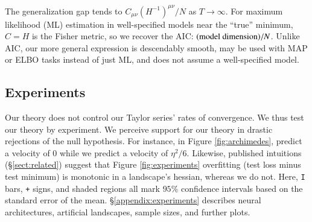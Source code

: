             The generalization gap tends  
            to $C_{\mu\nu}(H^{-1})^{\mu\nu}/N$ as $T\to\infty$.  For maximum
            likelihood (ML) estimation in well-specified models near the ``true''
            minimum, $C=H$ is the Fisher metric, so we recover the AIC:
            $(\textnormal{model dimension})/N$.  Unlike AIC, our more general
            expression is descendably smooth, may be used with MAP or ELBO tasks
            instead of just ML, and does not assume a well-specified model.

            \newpage
    \subsection{Experiments}
        Our theory does not control our Taylor series' rates of convergence. 
        We thus test our theory by experiment.  We perceive support for our
        theory in drastic rejections of the null hypothesis.  For instance, in
        Figure \ref{fig:archimedes}, \cite{ch18} predict a velocity of
        $0$ while we predict a velocity of $\eta^2/6$.  Likewise, published
        intuitions (\S\ref{sect:related}) suggest that Figure
        \ref{fig:experiments} overfitting (test loss minus test
        minimum) is monotonic in a landscape's hessian, whereas we do not.
        Here, \texttt{I} bars, \texttt{+} signs, and shaded regions all mark
        $95\%$ confidence intervals based on the standard error of the mean.
        \S\ref{appendix:experiments} describes neural architectures, artificial
        landscapes, sample sizes, and further plots.

